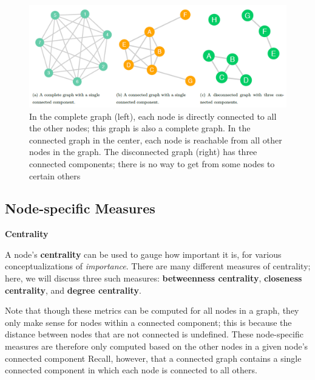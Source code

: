 \documentclass{book}
\begin{document}
\begin{figure}
\centering
\includegraphics{images/social-networks/11-6.png}
\caption{In the complete graph (left), each node is directly connected to all
the other nodes; this graph is also a complete graph. In the connected graph
in the center, each node is reachable from all other nodes in the graph. The
disconnected graph (right) has three connected components; there is no way to
get from some nodes to certain others}
\end{figure}

\hypertarget{node-specific-measures}{%
\subsection{Node-specific Measures}\label{node-specific-measures}}

\textbf{Centrality}

A node's \textbf{centrality} can be used to gauge how important it is, for
various conceptualizations of \emph{importance}. There are many different
measures of centrality; here, we will discuss three such measures:
\textbf{betweenness centrality}, \textbf{closeness centrality}, and
\textbf{degree centrality}.

Note that though these metrics can be computed for all nodes in a graph, they
only make sense for nodes within a connected component; this is because the
distance between nodes that are not connected is undefined. These
node-specific measures are therefore only computed based on the other nodes in
a given node's connected component Recall, however, that a connected graph
contains a single connected component in which each node is connected to all
others.
\end{document}
